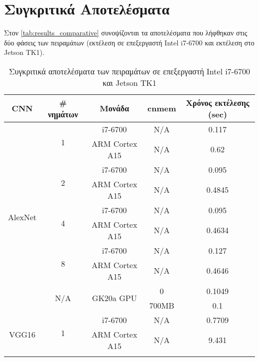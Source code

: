 \section{Συγκριτικά Αποτελέσματα}
\label{sec:experiments_comparative}

Στον \autoref{tab:results_comparative} συνοψίζονται τα αποτελέσματα που λήφθηκαν στις δύο φάσεις
των πειραμάτων (εκτέλεση σε επεξεργαστή Intel i7-6700 και εκτέλεση στο Jetson TK1).

\begin{table}[H]
  \begin{center}
    \caption{Συγκριτικά αποτελέσματα των πειραμάτων σε επεξεργαστή Intel i7-6700 και Jetson TK1}
    \label{tab:results_comparative}
    \small
    \begin{tabular}[center]{ | c | c | c | c | c | }
      \hline
      \rowcolor{Gray}
      CNN & \# νημάτων & Μονάδα & cnmem & Χρόνος εκτέλεσης (sec) \\
      \hline
      \multirow{10}{*}{AlexNet} & \multirow{2}{*}{1}    & i7-6700 & N/A & 0.117 \\ \cline{3-5}
                                &                       & ARM Cortex A15 & N/A & 0.62 \\ \cline{2-5}
                                & \multirow{2}{*}{2}    & i7-6700 & N/A & 0.095 \\ \cline{3-5}
                                &                       & ARM Cortex A15 & N/A & 0.4845 \\ \cline{2-5}
                                & \multirow{2}{*}{4}    & i7-6700 & N/A & 0.095 \\ \cline{3-5}
                                &                       & ARM Cortex A15 & N/A & 0.4634 \\ \cline{2-5}
                                & \multirow{2}{*}{8}    & i7-6700 & N/A & 0.127 \\ \cline{3-5}
                                &                       & ARM Cortex A15 & N/A & 0.4646 \\ \cline{2-5}
                                & \multirow{2}{*}{N/A}  & \multirow{2}{*}{GK20a GPU} & 0 & 0.1049 \\ \cline{4-5}
                                &                       &                            & 700MB & 0.1 \\ \hline
      \multirow{10}{*}{VGG16}   & \multirow{2}{*}{1}    & i7-6700 & N/A & 0.7709 \\ \cline{3-5}
                                &                       & ARM Cortex A15 & N/A & 9.431 \\ \cline{2-5}

\end{tabular}
\end{center}
\end{table}
